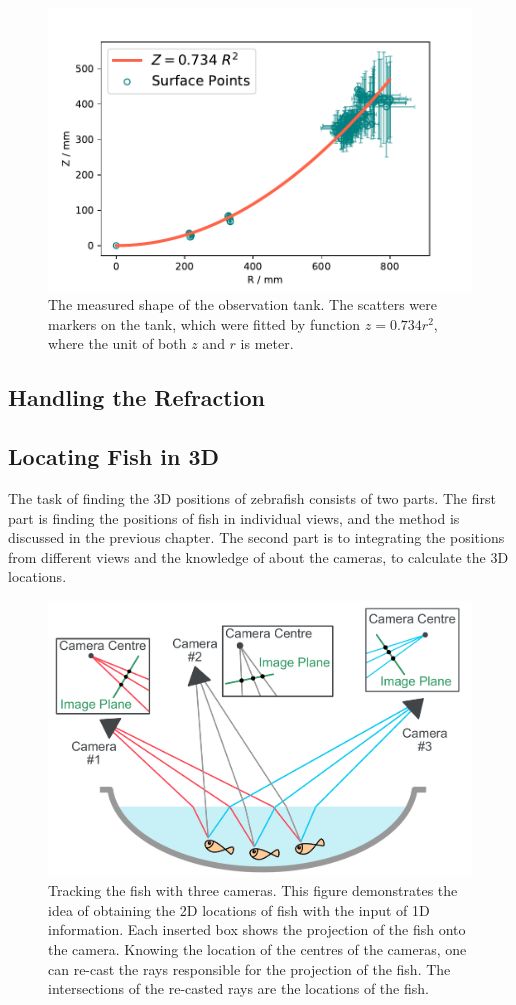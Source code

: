 \documentclass[11pt,twoside]{report}
\begin{document}
\begin{figure}
  \includegraphics[width=0.5\linewidth]{tank-fit.pdf}
  \caption{The measured shape of the observation tank. The scatters were markers on the tank, which were fitted by function $z=0.734 r^2$, where the unit of both $z$ and $r$ is meter.}
  \label{fig:tank}
\end{figure}



\subsection{Handling the Refraction}
\label{section:refraction}


\subsection{Locating Fish in 3D}
\label{section:locate_3d}

The task of finding the 3D positions of zebrafish consists of two parts. The first part is finding the positions of fish in individual views, and the method is discussed in the previous chapter. The second part is to integrating the positions from different views and the knowledge of about the cameras, to calculate the 3D locations.


\begin{figure}
  \includegraphics[width=0.8\linewidth]{track-3d-idea}
  \caption{Tracking the fish with three cameras. This figure demonstrates the idea of obtaining the 2D locations of fish with the input of 1D information. Each inserted box shows the projection of the fish onto the camera. Knowing the location of the centres of the cameras, one can re-cast the rays responsible for the projection of the fish. The intersections of the re-casted rays are the locations of the fish.}
  \label{fig:track_idea_3d}
\end{figure}
\end{document}
